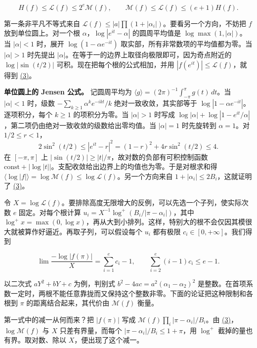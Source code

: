 \documentclass[11pt,a4paper]{article}
\begin{document}
\[
 H(f)\le \mathcal L(f)\le 2^e\mathcal M(f),\qquad
 \mathcal M(f)\le\mathcal L(f)\le(e+1)H(f).                             \tag{3}\label{eq:3}
\]

第一条非平凡不等式来自 \(\mathcal L(f)\le |a|\prod(1+|\alpha_i|)\)。要看另一个方向，不妨把 \(f\) 放到单位圆上。对一个根 \(\alpha\)，\(\log|e^{it}-\alpha|\) 的圆周平均值是 \(\log\max(1,|\alpha|)\)。当 \(|\alpha|<1\) 时，展开 \(\log(1-\alpha e^{-it})\) 取实部，所有非常数项的平均值都为零。当 \(|\alpha|>1\) 时先提出 \(|\alpha|\)。在等于一的边界上取径向极限即可，因为奇点附近的 \(\log|\sin(t/2)|\) 可积。现在把每个根的公式相加，并用 \(|f(e^{it})|\le\mathcal L(f)\)，就得到 \hyperref[eq:3]{(3)}。

\textbf{单位圆上的 Jensen 公式。} 记圆周平均为 \(\langle g\rangle=(2\pi)^{-1}\int_{-\pi}^{\pi}g(t)\,dt\)。当 \(|\alpha|<1\) 时，级数 \(-\sum_{k\ge1}\alpha^ke^{-ikt}/k\) 绝对一致收敛，其实部等于 \(\log|1-\alpha e^{-it}|\)。逐项积分，每个 \(k\ge1\) 的项积分为零。当 \(|\alpha|>1\) 时写成 \(\log|\alpha|+\log|1-e^{it}/\alpha|\)，第二项仍由绝对一致收敛的级数给出零均值。当 \(|\alpha|=1\) 时先旋转到 \(\alpha=1\)。对 \(1/2\le r<1\)， \[
 2\sin^2(t/2)\le |e^{it}-r|^2=(1-r)^2+4r\sin^2(t/2)\le4 .
\] 在 \([-\pi,\pi]\) 上 \(|\sin(t/2)|\ge |t|/\pi\)，故对数的负部有可积控制函数 \(\mathrm{const}+|\log|t||\)。支配收敛给出边界上的均值也为零。于是对根求和得 \(\langle\log|f|\rangle=\log\mathcal M(f)\le\log\mathcal L(f)\)。另一个方向来自 \(1+|\alpha_i|\le2B_i\)，这就证明了 \hyperref[eq:3]{(3)}。

令 \(X=\log\mathcal L(f)\)。要排除高度无限增大的反例，可以先选一个子列，使实际次数 \(e\) 固定。对每个根计算 \(u_i=X^{-1}\log^+(B_i/|\pi-\alpha_i|)\)，其中 \(\log^+x=\max(0,\log x)\)，再从大到小排列。这样，特别大的根不会仅因其模很大就被算作好逼近。再取子列，可以假设每个 \(u_i\) 都有极限 \(c_i\in[0,+\infty]\)。我们得到

\[
 \lim \frac{-\log|f(\pi)|}{X}=\sum_{i=1}^e c_i-1,\qquad
 \sum_{i=2}^e(i-1)c_i\le e-1.                                          \tag{4}\label{eq:4}
\]

以二次式 \(aY^2+bY+c\) 为例，判别式 \(b^2-4ac=a^2(\alpha_1-\alpha_2)^2\) 是整数。在首项系数一定时，两根不能任意靠拢而又保持这个整数非零。下面的论证把这种限制和各根到 \(\pi\) 的距离结合起来，其代价由 \(\mathcal M(f)\) 衡量。

第一式中的减一从何而来？把 \(|f(\pi)|\) 写成 \(\mathcal M(f)\prod_i|\pi-\alpha_i|/B_i\)。由 \hyperref[eq:3]{(3)}，\(\log\mathcal M(f)\) 与 \(X\) 只差有界量，而每个 \(|\pi-\alpha_i|/B_i\le 1+\pi\)，用 \(\log^+\) 截掉的量也有界。取对数、除以 \(X\)，便出现了这个减一。
\end{document}
